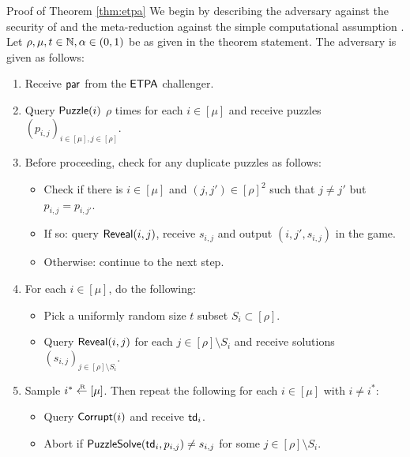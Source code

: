 \begin{namedproof}{Proof of Theorem \ref{thm:etpa}}
  We begin by describing the adversary \advA against the \ETPA security of \TP
  and the meta-reduction \redM against the simple computational assumption \Simple.
  Let \(\rho, \mu, t \in \mathbb{N}, \alpha \in (0,1)\) be as given in the theorem statement.
  The adversary \advA is given as follows:

  \begin{enumerate}[itemsep=0.1cm]
    \item\label{advA:init} Receive \(\mathsf{par}\) from the \(\mathsf{ETPA}\) challenger.
    \item\label{advA:query} Query \(\mathsf{Puzzle}(i)\) \(\rho\) times for each \(i \in [\mu]\)
          and receive puzzles \((p_{i,j})_{i \in [\mu], j \in [\rho]}\).
    \item\label{advA:check} Before proceeding, check for any duplicate puzzles as follows:
          \begin{itemize}[label={\textbullet},itemsep=0.1cm]
            \item Check if there is \(i \in [\mu]\) and \((j,j') \in [\rho]^{2}\) such that \(j \ne j'\) but
                  \(p_{i,j} = p_{i,j'}\).
            \item If so: query \(\mathsf{Reveal}(i,j)\), receive \(s_{i,j}\)
                  and output \((i,j',s_{i,j})\) in the \ETPA game.
            \item Otherwise: continue to the next step.
          \end{itemize}
    \item\label{advA:reveal} For each \(i \in [\mu]\), do the following:
          \begin{itemize}[label={\textbullet},itemsep=0.1cm]
            \item Pick a uniformly random size \(t\) subset \(S_{i} \subset [\rho]\).
            \item Query \(\mathsf{Reveal}(i,j)\) for each \(j \in [\rho] \setminus S_{i}\)
                  and receive solutions \((s_{i,j})_{j \in [\rho] \setminus S_{i}}\).
          \end{itemize}
    \item\label{advA:corrupt} Sample \(i^{*} \sampleR [\mu]\). Then repeat the following for each \(i \in [\mu]\) with \(i \ne i^{*}\):
          \begin{itemize}[label={\textbullet},itemsep=0.1cm]
            \item Query \(\mathsf{Corrupt}(i)\) and receive \(\mathsf{td}_{i}\).
            \item Abort if \(\mathsf{PuzzleSolve}(\mathsf{td}_{i},p_{i,j}) \ne s_{i,j}\) for some \(j \in [\rho] \setminus S_{i}\).

\end{itemize}
\end{enumerate}
\end{namedproof}
